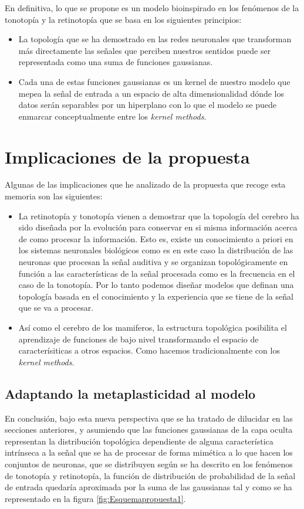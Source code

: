 \documentclass[10pt,a4paper]{report}
\begin{document}
En definitiva, lo que se propone es un modelo bioinspirado en los fenómenos de la tonotopía y la retinotopía que se basa en los siguientes principios:
\begin{itemize}
	\item La topología que se ha demostrado en las redes neuronales que transforman más directamente las señales que perciben nuestros sentidos puede ser representada como una suma de funciones gaussianas.
	\item Cada una de estas funciones gaussianas es un kernel de nuestro modelo que mepea la señal de entrada a un espacio de alta dimensionalidad dónde los datos serán separables por un hiperplano con lo que el modelo se puede enmarcar conceptualmente entre los \textit{kernel methods}.
\end{itemize}

\section{Implicaciones de la propuesta}
Algunas de las implicaciones que he analizado de la propuesta que recoge esta memoria son las siguientes:
\begin{itemize}
	\item La retinotopía y tonotopía vienen a demostrar que la topología del cerebro ha sido diseñada por la evolución para conservar en si misma información acerca de como procesar la información. Esto es, existe un conocimiento a priori en los sistemas neuronales biológicos como es en este caso la distribución de las neuronas que procesan la señal auditiva y se organizan topológicamente en función a las características de la señal procesada como es la frecuencia en el caso de la tonotopía. Por lo tanto podemos diseñar modelos que definan una topología basada en el conocimiento y la experiencia que se tiene de la señal que se va a procesar.
	\item Así como el cerebro de los mamiferos, la estructura topológica posibilita el aprendizaje de funciones de bajo nivel transformando el espacio de caracterísiticas a otros espacios. Como hacemos tradicionalmente con los \textit{kernel methods}.
\end{itemize}

\subsection{Adaptando la metaplasticidad al modelo}
En conclusión, bajo esta nueva perspectiva que se ha tratado de dilucidar en las secciones anteriores, y asumiendo que las funciones gaussianas de la capa oculta representan la distribución topológica dependiente de alguna característica intrínseca a la señal que se ha de procesar de forma mimética a lo que hacen los conjuntos de neuronas, que se distribuyen según se ha descrito en los fenómenos de tonotopía y retinotopía, la función de distribución de probabilidad de la señal de entrada quedaría aproximada por la suma de las gaussianas tal y como se ha representado en la figura \ref{fig:Esquemapropuesta1}. 
\end{document}
